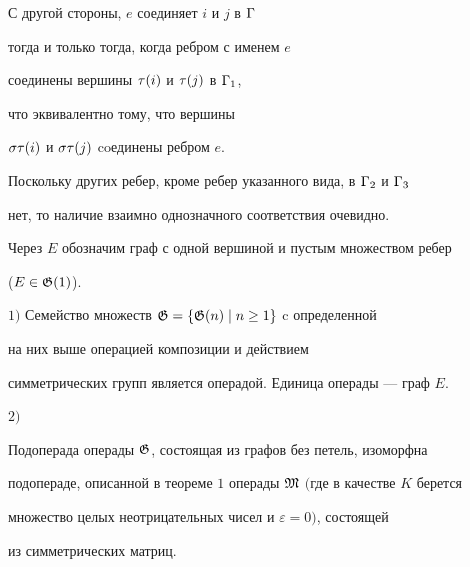 С другой стороны, $e$ соединяет $i$ и $j$ в ${\Gamma}$ 


тогда и только тогда, когда ребром с именем $e$ 


соединены вершины $\tau (i)$ и $\tau (j)$ в ${\Gamma}_1$, 


что эквивалентно тому, что вершины 


$\sigma\tau (i)$ и $\sigma\tau (j)$ coединены ребром $e$. 


Поскольку других ребер, кроме ребер указанного вида, в ${\Gamma}_2$ и ${\Gamma}_3$


нет, то наличие взаимно однозначного соответствия очевидно.





Через $E$ обозначим граф с одной вершиной и пустым множеством ребер


($E\in{\frak G} (1)$).





\begin{thm}


$1)$ Семейство множеств ${\frak G}=\{{\frak G} (n) \mid n\geq 1\}$ c определенной 


на них выше операцией композиции и действием 


симметрических групп является операдой. Единица операды --- граф $E$.





$2)$


Подоперада операды ${\frak G}$, состоящая из графов без петель, изоморфна


подопераде, описанной в теореме $1$ операды ${\frak M}$ $($где в качестве $K$ берется


множество целых неотрицательных чисел и $\varepsilon=0)$, состоящей


из симметрических матриц.


\end{thm}





